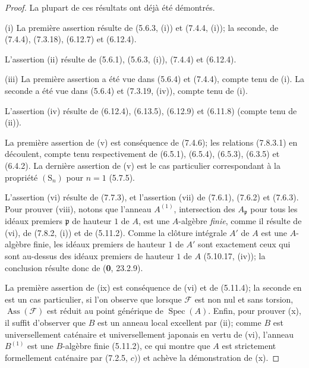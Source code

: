 \begin{proof}
La plupart de ces résultats ont déjà été démontrés.

(i) La première assertion résulte de (5.6.3, (i)) et (7.4.4, (i)); la seconde,
de (7.4.4), (7.3.18), (6.12.7) et (6.12.4).

L'assertion (ii) résulte de (5.6.1), (5.6.3, (i)), (7.4.4) et (6.12.4).

(iii) La première assertion a été vue dans (5.6.4) et (7.4.4), compte tenu de
(i). La seconde a été vue dans (5.6.4) et (7.3.19, (iv)), compte tenu de (i).

L'assertion (iv) résulte de (6.12.4), (6.13.5), (6.12.9) et (6.11.8) (compte
tenu de (ii)).

La première assertion de (v) est conséquence de (7.4.6); les relations
(7.8.3.1) en découlent, compte tenu respectivement de (6.5.1), (6.5.4),
(6.5.3), (6.3.5) et (6.4.2). La dernière assertion de (v) est le cas
particulier correspondant à la propriété $(\mathrm S_n)$ pour $n=1$ (5.7.5).

L'assertion (vi) résulte de (7.7.3), et l'assertion (vii) de (7.6.1), (7.6.2)
et (7.6.3). Pour prouver (viii), notons que l'anneau $A^{(1)}$, intersection
des $A_{\mathfrak p}$ pour tous les idéaux premiers $\mathfrak p$ de hauteur
$1$ de $A$, est une $A$-algèbre \emph{finie}, comme il résulte de (vi), de (7.8.2,
(i)) et de (5.11.2). Comme la clôture intégrale $A'$ de $A$ est une $A$-algèbre
finie, les idéaux premiers de hauteur $1$ de $A'$ sont exactement ceux qui sont
au-dessus des idéaux premiers de hauteur $1$ de $A$ (5.10.17, (iv)); la
conclusion résulte donc de (\textbf{0}, 23.2.9).

La première assertion de (ix) est conséquence de (vi) et de (5.11.4); la
seconde en est un cas particulier, si l'on observe que lorsque $\mathcal F$ est
non nul et sans torsion, $\operatorname{Ass}(\mathcal F)$ est réduit au point générique de
$\operatorname{Spec}(A)$. Enfin, pour prouver (x), il suffit d'observer que $B$
est un anneau local excellent par (ii); comme $B$ est universellement caténaire
et universellement japonais en vertu de (vi), l'anneau $B^{(1)}$ est une
$B$-algèbre finie (5.11.2), ce qui montre que $A$ est strictement formellement
caténaire par (7.2.5, $c)$) et achève la démonstration de (x).
\end{proof}

